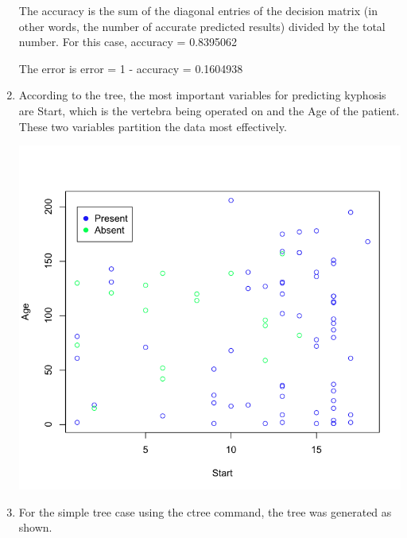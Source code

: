 \documentclass[11pt]{article}
\begin{document}
\begin{enumerate}
The accuracy is the sum of the diagonal entries of the decision matrix (in 
other words, the number of accurate predicted results) divided by the total 
number. For this case, 
accuracy = 0.8395062

The error is 
error = 1 - accuracy = 0.1604938

\item According to the tree, the most important variables for predicting 
kyphosis are Start, which is the vertebra being operated on and the 
Age of the patient. 
These two variables partition the data most effectively. 

\begin{center}
\includegraphics[scale=0.35]{scatterplot}
\end{center}

\item For the simple tree case using the ctree command, the tree was 
generated as shown. 


\end{enumerate}
\end{document}
